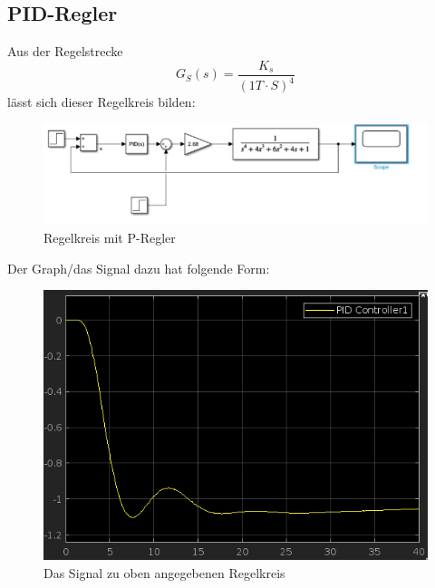 \documentclass{article}
\begin{document}
		\subsection{PID-Regler}
			Aus der Regelstrecke 
			$$G_S(s) = \frac{K_s}{(1 T\cdot S)^4}$$
			lässt sich dieser Regelkreis bilden:
			\begin{figure}[h]
				\includegraphics[scale=0.6, center]{4_c_Blockschaltbild.png}
				\caption{Regelkreis mit P-Regler}
				\label{fig37: Blockschaltbild_PID_Regler}
			\end{figure}
			Der Graph/das Signal dazu hat folgende Form:
			\begin{figure}[h]
				\includegraphics[scale = 0.6, center]{4_c_Graph.png}
				\caption{Das Signal zu oben angegebenen Regelkreis}
				\label{fig38: 4_c_Graph}
			\end{figure}
\newpage
\end{document}
